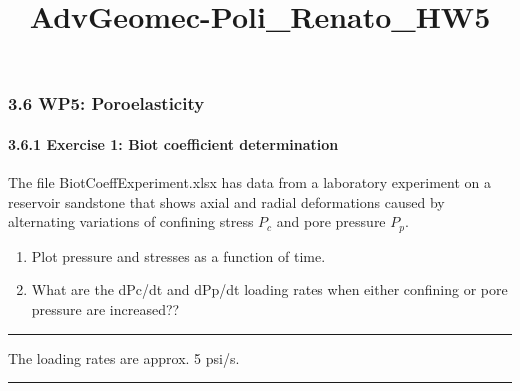 \documentclass[8pt]{extarticle}
\title{AdvGeomec-Poli\_Renato\_HW5}
\begin{document}
    
    \maketitle
    
    

    
    \hypertarget{wp5-poroelasticity}{%
\subsubsection*{3.6 WP5: Poroelasticity}\label{wp5-poroelasticity}}

\hypertarget{exercise-1-biot-coefficient-determination}{%
\paragraph{3.6.1 Exercise 1: Biot coefficient
determination}\label{exercise-1-biot-coefficient-determination}}

The file BiotCoeffExperiment.xlsx has data from a laboratory experiment
on a reservoir sandstone that shows axial and radial deformations caused
by alternating variations of confining stress \(P_c\) and pore pressure
\(P_p\).

\begin{enumerate}
\def\labelenumi{\alph{enumi}.}
\item
  Plot pressure and stresses as a function of time.
\item
  What are the dPc/dt and dPp/dt loading rates when either confining or
  pore pressure are increased??
\end{enumerate}

\begin{center}\rule{0.5\linewidth}{0.5pt}\end{center}

The loading rates are approx. 5 psi/s.

\begin{center}\rule{0.5\linewidth}{0.5pt}\end{center}
\end{document}
